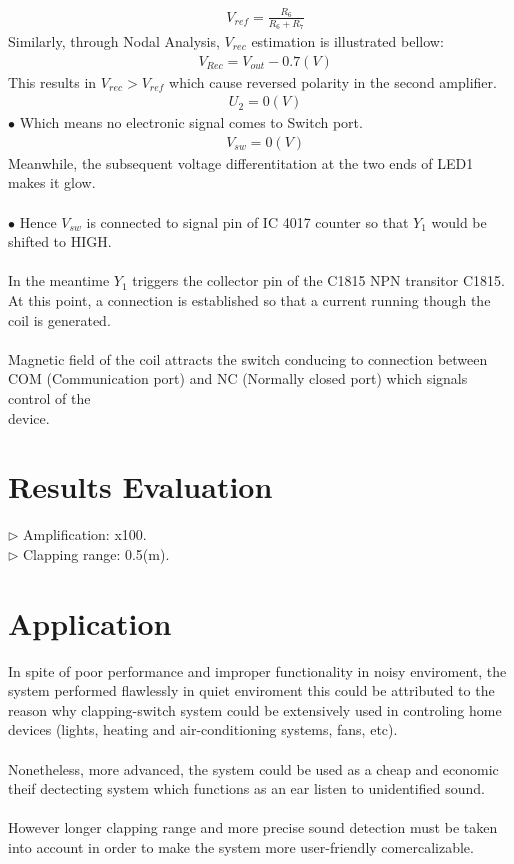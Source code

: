 \documentclass[12pt]{extarticle}
\newcommand{\<}{\langle}
\newcommand\tab[1][1cm]{\hspace*{#1}}
\renewcommand{\>}{\rangle}
\theoremstyle{definition}
\begin{document}
\begin{normalsize}
\begin{align*}
&V_{ref} = \frac{R_6}{R_6 + R_7}
\end{align*}
Similarly, through Nodal Analysis, $V_{rec}$ estimation is illustrated bellow:
\begin{align*}
&V_{Rec} = V_{out} - 0.7 (V)
\end{align*}
This results in $V_{rec} > V_{ref}$ which cause reversed polarity in the second amplifier.
\begin{align*}
&U_2 = 0(V)
\end{align*}
$\bullet $ Which means no electronic signal comes to Switch port.
\begin{align*}
&V_{sw} = 0(V)
\end{align*}
Meanwhile, the subsequent voltage differentitation at the two ends of LED1 makes it glow. \\
\\
$\bullet $ Hence $V_{sw}$ is connected to signal pin of IC 4017 counter so that $Y_1$ would be shifted to HIGH.\\
\\
In the meantime $Y_1$ triggers the collector pin of the C1815 NPN transitor C1815. At this point, a connection is established so that a current running though the coil is generated.\\
\\
Magnetic field of the coil attracts the switch conducing to connection between COM (Communication port) and NC (Normally closed port) which signals control of the\\ device.
\clearpage
\section{Results Evaluation}
\tab $\triangleright$ Amplification: x100.\\
\tab $\triangleright$ Clapping range: 0.5(m).
\section{Application}
In spite of poor performance and improper functionality in noisy enviroment, the system performed flawlessly in quiet enviroment this could be attributed to the reason why clapping-switch system could be extensively used in controling home devices (lights, heating and air-conditioning systems, fans, etc). \\
\\
Nonetheless, more advanced, the system could be used as a cheap and economic theif dectecting system which functions as an ear listen to unidentified sound.\\
\\
However longer clapping range and more precise sound detection must be taken into account in order to make the system more user-friendly comercalizable.
\end{normalsize}
\end{document}
